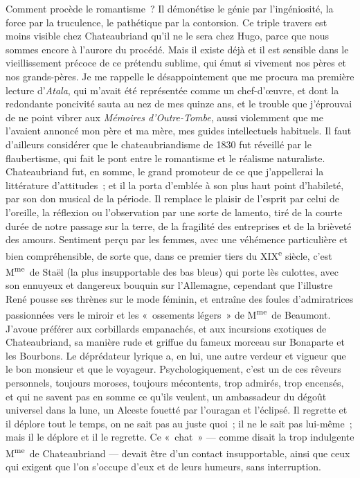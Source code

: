 \documentclass[french,twoside]{book} %
\begin{document}
Comment procède le romantisme ? Il démonétise le génie par l’ingéniosité, la force par la truculence, le pathétique par la contorsion. Ce triple travers est moins visible chez Chateaubriand qu’il ne le sera chez Hugo, parce que nous sommes encore à l’aurore du procédé. Mais il existe déjà et il est sensible dans le vieillissement précoce de ce prétendu sublime, qui émut si vivement nos pères et nos grands-pères. Je me rappelle le désappointement que me procura ma première lecture d’{\itshape Atala}, qui m’avait été représentée comme un chef-d’œuvre, et dont la redondante poncivité sauta au nez de mes quinze ans, et le trouble que j’éprouvai de ne point vibrer aux {\itshape Mémoires d’Outre-Tombe}, aussi violemment que me l’avaient annoncé mon père et ma mère, mes guides intellectuels habituels. Il faut d’ailleurs considérer que le chateaubriandisme de 1830 fut réveillé par le flaubertisme, qui fait le pont entre le romantisme et le réalisme naturaliste. Chateaubriand fut, en somme, le grand promoteur de ce que j’appellerai la littérature d’attitudes ; et il la porta d’emblée à son plus haut point d’habileté, par son don musical de la période. Il remplace le plaisir de l’esprit par celui de l’oreille, la réflexion ou l’observation par une sorte de lamento, tiré de la courte durée de notre passage sur la terre, de la fragilité des entreprises et de la brièveté des amours. Sentiment perçu par les femmes, avec une véhémence particulière et bien compréhensible, de sorte que, dans ce premier tiers du XIX\textsuperscript{e} siècle, c’est M\textsuperscript{me} de Staël (la plus insupportable des bas bleus) qui porte lès culottes, avec son ennuyeux et dangereux bouquin sur l’Allemagne, cependant que l’illustre René pousse ses thrènes sur le mode féminin, et entraîne des foules d’admiratrices passionnées vers le miroir et les « ossements légers » de M\textsuperscript{me} de Beaumont. J’avoue préférer aux corbillards empanachés, et aux incursions exotiques de Chateaubriand, sa manière rude et griffue du fameux morceau sur Bonaparte et les Bourbons. Le déprédateur lyrique a, en lui, une autre verdeur et vigueur que le bon monsieur et que le voyageur. Psychologiquement, c’est un de ces rêveurs personnels, toujours moroses, toujours mécontents, trop admirés, trop encensés, et qui ne savent pas en somme ce qu’ils veulent, un ambassadeur du dégoût universel dans la lune, un Alceste fouetté par l’ouragan et l’éclipsé. Il regrette et il déplore tout le temps, on ne sait pas au juste quoi ; il ne le sait pas lui-même ; mais il le déplore et il le regrette. Ce « chat » — comme disait la trop indulgente M\textsuperscript{me} de Chateaubriand — devait être d’un contact insupportable, ainsi que ceux qui exigent que l’on s’occupe d’eux et de leurs humeurs, sans interruption.\par
\end{document}

